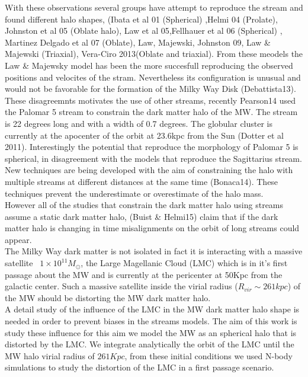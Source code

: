 \documentclass[16pt]{article}
\begin{document}
With these observations several groups have attempt to reproduce the stream and found 
different halo shapes, (Ibata et al 01 (Spherical)
,Helmi 04 (Prolate), Johnston et al 05 (Oblate halo), Law et al 05,Fellhauer et al 06 (Spherical)
, Martinez Delgado et al 07 (Oblate), Law, Majewski, Johnston 09, Law \& Majewski (Triaxial),
Vera-Ciro 2013(Oblate and triaxial). From these meodels the Law \& Majewsky model has been 
the more succesfull reproducing the observed positions and velocites of the stram. Nevertheless
its configuration is unusual and would not be favorable for the formation of the Milky Way Disk
(Debattista13).\\


These disagreemnts motivates the use of other streams, 
recently Pearson14 used the Palomar 5 stream to constrain the dark 
matter halo of the MW. The stream is 22 degrees
long and with a width of 0.7 degrees. The globular cluster is currently at the 
apocenter of the orbit at 23.6kpc from the Sun (Dotter et al 2011). Interestingly
the potential that reproduce the morphology of Palomar 5 is spherical, in 
disagreement with the models that reproduce the Sagittarius stream.\\

New techniques are being developed with the aim of constraining the halo with multiple
streams at different distances at the same time (Bonaca14). These techniques 
prevent the underestimate or overestimate of the halo mass. \\

However all of the studies that constrain the dark matter halo using streams
assume a static dark matter halo, (Buist \& Helmi15) claim that if the dark matter
halo is changing in time misalignments on the orbit of long streams could appear.\\     

The Milky Way dark matter is not isolated in fact it is interacting with a 
massive satellite ~$1\times10^{11}M_{\odot}$, the Large Magellanic Cloud (LMC)
which is in it's first passage about the MW and is currently at the pericenter
at 50Kpc from the galactic center. Such a massive satellite inside the virial 
radius ($R_{vir}\sim 261kpc$) of the MW should be distorting the MW dark matter
halo. \\

A detail study of the influence of the LMC in the MW dark matter halo
shape is needed in order to prevent biases in the streams models. 
The aim of this work is study these influence for this aim 
we model the MW as an spherical halo that is distorted by the LMC. We integrate 
analytically the orbit of the LMC until the MW halo virial radius of $261Kpc$, 
from these initial conditions we used N-body simulations to study the distortion 
of the LMC in a first passage scenario.   
  
\end{document}
